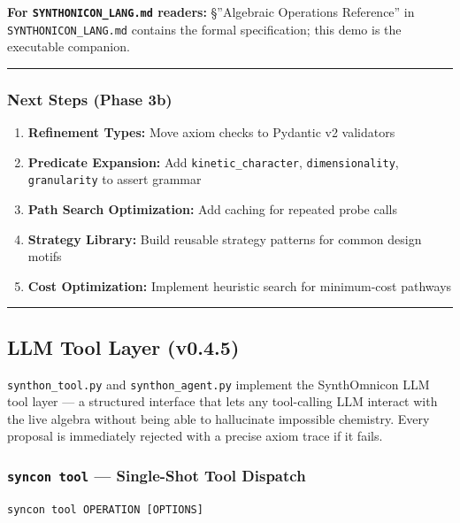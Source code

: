\documentclass[12pt,a4paper]{article}
\begin{document}
\textbf{For \texttt{SYNTHONICON\_LANG.md} readers:} §''Algebraic Operations Reference'' in \texttt{SYNTHONICON\_LANG.md} contains the formal specification; this demo is the executable companion.

\begin{center}
\rule{0.5\textwidth}{0.4pt}
\end{center}

\subsubsection{Next Steps (Phase 3b)}

\begin{enumerate}
    \item \textbf{Refinement Types:} Move axiom checks to Pydantic v2 validators
    \item \textbf{Predicate Expansion:} Add \texttt{kinetic\_character}, \texttt{dimensionality}, \texttt{granularity} to assert grammar
    \item \textbf{Path Search Optimization:} Add caching for repeated probe calls
    \item \textbf{Strategy Library:} Build reusable strategy patterns for common design motifs
    \item \textbf{Cost Optimization:} Implement heuristic search for minimum-cost pathways
\end{enumerate}

\begin{center}
\rule{0.5\textwidth}{0.4pt}
\end{center}

\subsection{LLM Tool Layer (v0.4.5)}

\texttt{synthon\_tool.py} and \texttt{synthon\_agent.py} implement the SynthOmnicon LLM tool layer --- a structured interface that lets any tool-calling LLM interact with the live algebra without being able to hallucinate impossible chemistry. Every proposal is immediately rejected with a precise axiom trace if it fails.

\subsubsection{\texttt{syncon tool} --- Single-Shot Tool Dispatch}

\begin{lstlisting}
syncon tool OPERATION [OPTIONS]
\end{lstlisting}
\end{document}
